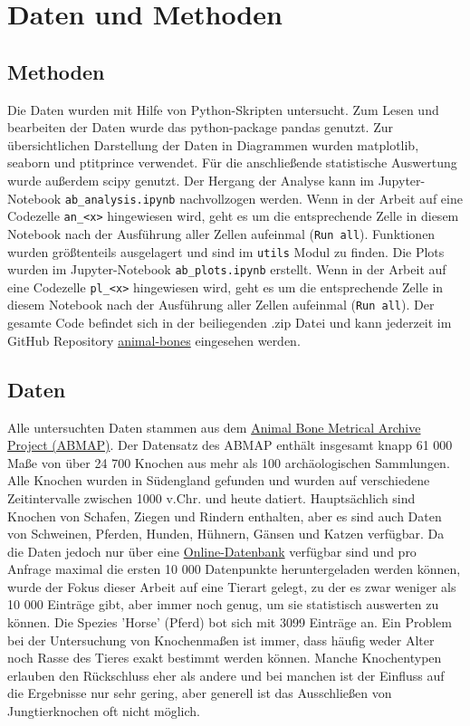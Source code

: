 \section{Daten und Methoden}

\subsection{Methoden}
Die Daten wurden mit Hilfe von Python\cite{pythonPY}-Skripten untersucht. 
Zum Lesen und bearbeiten der Daten wurde das python-package pandas\cite{pandasPY} genutzt. Zur übersichtlichen Darstellung der Daten in Diagrammen wurden matplotlib\cite{matplotlibPY}, seaborn\cite{matplotlibPY} und ptitprince\cite{ptitprincePY} verwendet. 
Für die anschließende statistische Auswertung wurde außerdem
scipy\cite{scipyPY} genutzt.
Der Hergang der Analyse kann im Jupyter-Notebook \texttt{ab\_analysis.ipynb} nachvollzogen werden. 
Wenn in der Arbeit auf eine Codezelle \texttt{an\_<x>} hingewiesen wird, geht es um die entsprechende Zelle in diesem Notebook nach der Ausführung aller Zellen aufeinmal (\texttt{Run all}).
Funktionen wurden größtenteils ausgelagert und sind im \texttt{utils} Modul zu finden. 
Die Plots wurden im Jupyter-Notebook \texttt{ab\_plots.ipynb} erstellt.
Wenn in der Arbeit auf eine Codezelle \texttt{pl\_<x>} hingewiesen wird, geht es um die entsprechende Zelle in diesem Notebook nach der Ausführung aller Zellen aufeinmal (\texttt{Run all}).
Der gesamte Code befindet sich in der beiliegenden .zip Datei und kann jederzeit im GitHub Repository \href{https://github.com/Graunarmin/animal-bones}{animal-bones} eingesehen werden.

\subsection{Daten}
Alle untersuchten Daten stammen aus dem \href{https://archaeologydataservice.ac.uk/archives/view/abmap/}{Animal Bone Metrical Archive Project (ABMAP)}.
Der Datensatz des ABMAP enthält insgesamt knapp 61 000 Maße von über 24 700 Knochen aus mehr als 100 archäologischen Sammlungen.
Alle Knochen wurden in Südengland gefunden und wurden auf verschiedene Zeitintervalle zwischen 1000 v.Chr. und heute datiert. 
Hauptsächlich sind Knochen von Schafen, Ziegen und Rindern enthalten, aber es sind auch Daten von Schweinen, Pferden, Hunden, Hühnern, Gänsen und Katzen verfügbar. 
Da die Daten jedoch nur über eine \href{https://archaeologydataservice.ac.uk/archives/view/abmap/search.cfm}{Online-Datenbank} verfügbar sind und pro Anfrage maximal die ersten 10 000 Datenpunkte heruntergeladen werden können, wurde der Fokus dieser Arbeit auf eine Tierart gelegt, zu der es zwar weniger als 10 000 Einträge gibt, aber immer noch genug, um sie statistisch auswerten zu können. 
Die Spezies 'Horse' (Pferd) bot sich mit 3099 Einträge an.
Ein Problem bei der Untersuchung von Knochenmaßen ist immer, dass häufig weder Alter noch Rasse des Tieres exakt bestimmt werden können. Manche Knochentypen erlauben den Rückschluss eher als andere und bei manchen ist der Einfluss auf die Ergebnisse nur sehr gering, aber generell ist das Ausschließen von Jungtierknochen oft nicht möglich\cite{Driesch1976}.

